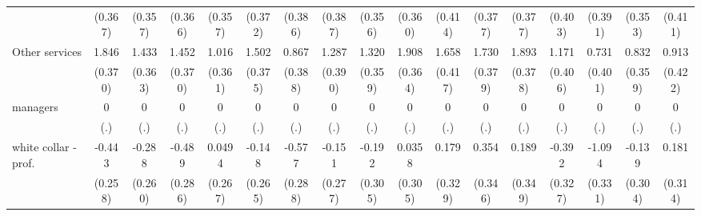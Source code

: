 {\begin{tabular}{l*{16}{c}}
                    &     (0.367)         &     (0.357)         &     (0.366)         &     (0.357)         &     (0.372)         &     (0.386)         &     (0.387)         &     (0.356)         &     (0.360)         &     (0.414)         &     (0.377)         &     (0.377)         &     (0.403)         &     (0.391)         &     (0.353)         &     (0.411)         \\
[1em]
Other services      &       1.846\sym{***}&       1.433\sym{***}&       1.452\sym{***}&       1.016\sym{**} &       1.502\sym{***}&       0.867\sym{*}  &       1.287\sym{***}&       1.320\sym{***}&       1.908\sym{***}&       1.658\sym{***}&       1.730\sym{***}&       1.893\sym{***}&       1.171\sym{**} &       0.731         &       0.832\sym{*}  &       0.913\sym{*}  \\
                    &     (0.370)         &     (0.363)         &     (0.370)         &     (0.361)         &     (0.375)         &     (0.388)         &     (0.390)         &     (0.359)         &     (0.364)         &     (0.417)         &     (0.379)         &     (0.378)         &     (0.406)         &     (0.401)         &     (0.359)         &     (0.422)         \\
[1em]
managers            &           0         &           0         &           0         &           0         &           0         &           0         &           0         &           0         &           0         &           0         &           0         &           0         &           0         &           0         &           0         &           0         \\
                    &         (.)         &         (.)         &         (.)         &         (.)         &         (.)         &         (.)         &         (.)         &         (.)         &         (.)         &         (.)         &         (.)         &         (.)         &         (.)         &         (.)         &         (.)         &         (.)         \\
[1em]
white collar - prof.&      -0.443         &      -0.288         &      -0.489         &      0.0494         &      -0.148         &      -0.577\sym{*}  &      -0.151         &      -0.192         &      0.0358         &       0.179         &       0.354         &       0.189         &      -0.392         &      -1.094\sym{***}&      -0.139         &       0.181         \\
                    &     (0.258)         &     (0.260)         &     (0.286)         &     (0.267)         &     (0.265)         &     (0.288)         &     (0.277)         &     (0.305)         &     (0.305)         &     (0.329)         &     (0.346)         &     (0.349)         &     (0.327)         &     (0.331)         &     (0.304)         &     (0.314)         \\

\end{tabular}}
